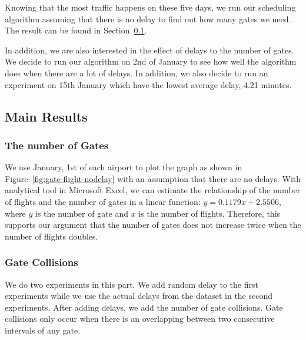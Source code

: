 \documentclass[11pt,a4paper]{article}
\begin{document}
Knowing that the most traffic happens on these five days, we run our scheduling algorithm assuming that there is no delay to find out how many gates we need. The result can be found in Section~\ref{subsec:expo-resu}. \par 
In addition, we are also interested in the effect of delays to the number of gates. We decide to run our algorithm on 2nd of January to see how well the algorithm does when there are a lot of delays. In addition, we also decide to run an experiment on 15th January which have the lowest average delay, 4.21 minutes.

\subsection{Main Results}
\label{subsec:expo-resu}
\subsubsection{The number of Gates} We use January, 1st of each airport to plot the graph as shown in Figure~\ref{fig:gate-flight-nodelay} with an assumption that there are no delays. With analytical tool in Microsoft Excel, we can estimate the relationship of the number of flights and the number of gates in a linear function: $y = 0.1179x + 2.5506$, where $y$ is the number of gate and $x$ is the number of flights. Therefore, this supports our argument that the number of gates does not increase twice when the number of flights doubles.

\subsubsection{Gate Collisions} We do two experiments in this part. We add random delay to the first experiments while we use the actual delays from the dataset in the second experiments. After adding delays, we add the number of gate collisions. Gate collisions only occur when there is an overlapping between two consecutive intervals of any gate.
\end{document}
